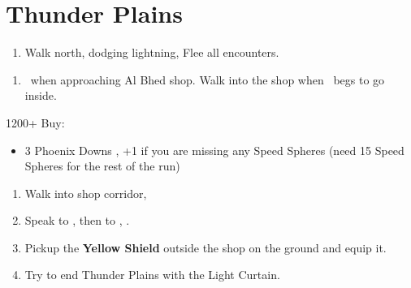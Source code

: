 \chapter{Thunder Plains}

\begin{enumerate}
    \item Walk north, dodging lightning, Flee all encounters.
\end{enumerate}
\begin{enumerate}[resume]
    \item \sd\ when approaching Al Bhed shop. Walk into the shop when \rikku\ begs to go inside.
\end{enumerate}
\begin{shop}{1200+}
    Buy:
    \begin{itemize}
        \item 3 Phoenix Downs
        , +1 if you are missing any Speed Spheres (need 15 Speed Spheres for the rest of the run)
    \end{itemize}
\end{shop}
\begin{enumerate}[resume]
    \item Walk into shop corridor, \cs[2:00]
    \item Speak to \auron, then to \rikku, \sd.
    \item Pickup the \textbf{Yellow Shield} outside the shop on the ground and equip it.
    \item Try to end Thunder Plains with the Light Curtain.
\end{enumerate}
